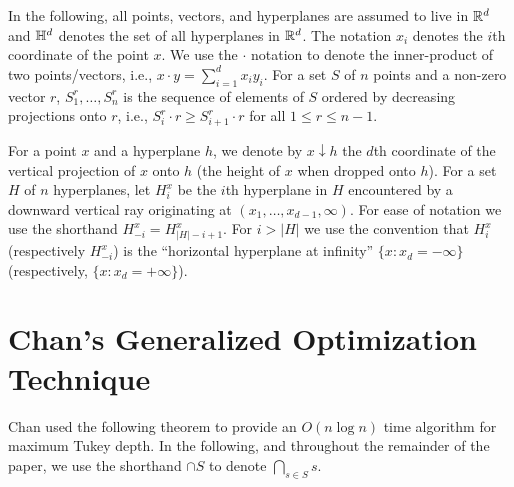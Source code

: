 \documentclass[lotsofwhite]{patmorin}
\newcommand{\drop}{\!\!\downarrow\!\!}
\begin{document}
In the following, all points, vectors, and hyperplanes are assumed to
live in $\mathbb{R}^d$ and $\mathbb{H}^d$ denotes the set of all hyperplanes in
$\mathbb{R}^d$.  The notation $x_i$ denotes the $i$th coordinate of the point
$x$.  We use the $\cdot$ notation to denote the inner-product of two
points/vectors, i.e., $x\cdot y=\sum_{i=1}^d x_iy_i$.  For a set $S$
of $n$ points and a non-zero vector $r$, $S_1^r,\ldots,S_n^r$ is the
sequence of elements of $S$ ordered by decreasing projections onto
$r$, i.e., $S_i^r\cdot r \ge S_{i+1}^r\cdot r$ for all $1\le r\le
n-1$.

For a point $x$ and a hyperplane $h$, we denote by $x\drop h$ the
$d$th coordinate of the vertical projection of $x$ onto $h$ (the
height of $x$ when dropped onto $h$).  For a set $H$ of $n$
hyperplanes, let $H_i^x$ be the $i$th hyperplane in $H$ encountered by
a downward vertical ray originating at $(x_1,\ldots,x_{d-1},\infty)$.
For ease of notation we use the shorthand $H_{-i}^x=H_{|H|-i+1}^x$.
For $i>|H|$ we use the convention that $H_{i}^x$ (respectively
$H_{-i}^x$) is the ``horizontal hyperplane at infinity''
$\{x:x_d=-\infty\}$ (respectively, $\{x:x_d=+\infty\}$). 

\section{Chan's Generalized Optimization Technique}

Chan \cite{c2004} used the following theorem to provide an $O(n\log
n)$ time algorithm for maximum Tukey depth.  In the following, and
throughout the remainder of the paper, we use the shorthand $\cap S$
to denote $\bigcap_{s\in S}s$.
\end{document}
